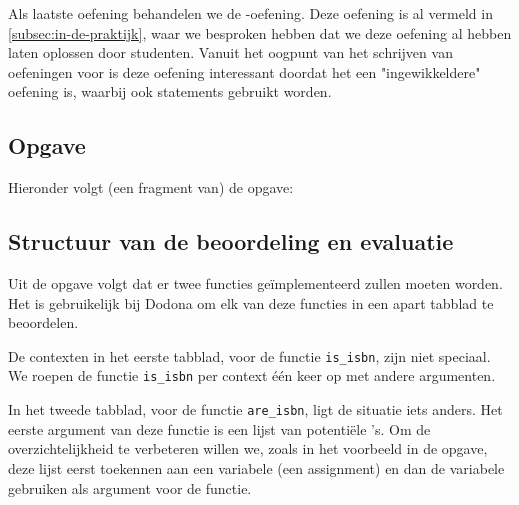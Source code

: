 Als laatste oefening behandelen we de \emph{}-oefening.
Deze oefening is al vermeld in \cref{subsec:in-de-praktijk}, waar we besproken hebben dat we deze oefening al hebben laten oplossen door studenten.
Vanuit het oogpunt van het schrijven van oefeningen voor \tested{} is deze oefening interessant doordat het een "ingewikkeldere" oefening is, waarbij ook statements gebruikt worden.

\subsection{Opgave}\label{subsec:oefeningen-isbn-opgave}

Hieronder volgt (een fragment van) de opgave:

\begin{quote}
\end{quote}


\subsection{Structuur van de beoordeling en evaluatie}\label{subsec:oefening-isbn-structuur}

Uit de opgave volgt dat er twee functies geïmplementeerd zullen moeten worden.
Het is gebruikelijk bij Dodona om elk van deze functies in een apart tabblad te beoordelen.

De contexten in het eerste tabblad, voor de functie \texttt{is\_isbn}, zijn niet speciaal.
We roepen de functie \texttt{is\_isbn} per context één keer op met andere argumenten.

In het tweede tabblad, voor de functie \texttt{are\_isbn}, ligt de situatie iets anders.
Het eerste argument van deze functie is een lijst van potentiële 's.
Om de overzichtelijkheid te verbeteren willen we, zoals in het voorbeeld in de opgave, deze lijst eerst toekennen aan een variabele (een assignment) en dan de variabele gebruiken als argument voor de functie.

